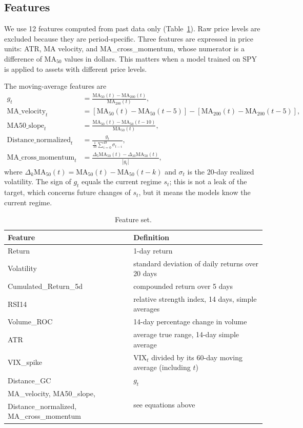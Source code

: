 \documentclass[11pt,a4paper]{article}
\begin{document}
\subsection{Features}

We use 12 features computed from past data only (Table~\ref{tab:features}). Raw price levels are
excluded because they are period-specific. Three features are expressed in price units: ATR,
MA velocity, and MA\_cross\_momentum, whose numerator is a difference of $\mathrm{MA}_{50}$ values
in dollars. This matters when a model trained on SPY is applied to assets with different price
levels.

The moving-average features are
\begin{align}
  g_t &= \frac{\mathrm{MA}_{50}(t)-\mathrm{MA}_{200}(t)}{\mathrm{MA}_{200}(t)}, \\
  \text{MA\_velocity}_t &= \left[\mathrm{MA}_{50}(t)-\mathrm{MA}_{50}(t-5)\right]
                          -\left[\mathrm{MA}_{200}(t)-\mathrm{MA}_{200}(t-5)\right], \\
  \text{MA50\_slope}_t &= \frac{\mathrm{MA}_{50}(t)-\mathrm{MA}_{50}(t-10)}{\mathrm{MA}_{50}(t)}, \\
  \text{Distance\_normalized}_t &= \frac{g_t}{\frac{1}{50}\sum_{i=0}^{49}\sigma_{t-i}}, \\
  \text{MA\_cross\_momentum}_t &= \frac{\Delta_5\mathrm{MA}_{50}(t)-\Delta_{10}\mathrm{MA}_{50}(t)}{|g_t|},
\end{align}
where $\Delta_k\mathrm{MA}_{50}(t)=\mathrm{MA}_{50}(t)-\mathrm{MA}_{50}(t-k)$ and $\sigma_t$ is the
20-day realized volatility. The sign of $g_t$ equals the current regime $s_t$; this is not a leak of
the target, which concerns future changes of $s_t$, but it means the models know the current regime.

\begin{table}[h]
\centering
\begin{tabular}{ll}
\toprule
Feature & Definition \\
\midrule
Return & 1-day return \\
Volatility & standard deviation of daily returns over 20 days \\
Cumulated\_Return\_5d & compounded return over 5 days \\
RSI14 & relative strength index, 14 days, simple averages \\
Volume\_ROC & 14-day percentage change in volume \\
ATR & average true range, 14-day simple average \\
VIX\_spike & $\mathrm{VIX}_t$ divided by its 60-day moving average (including $t$) \\
Distance\_GC & $g_t$ \\
MA\_velocity, MA50\_slope, & \multirow{2}{*}{see equations above} \\
Distance\_normalized, MA\_cross\_momentum & \\
\bottomrule
\end{tabular}
\caption{Feature set.}
\label{tab:features}
\end{table}
\end{document}
